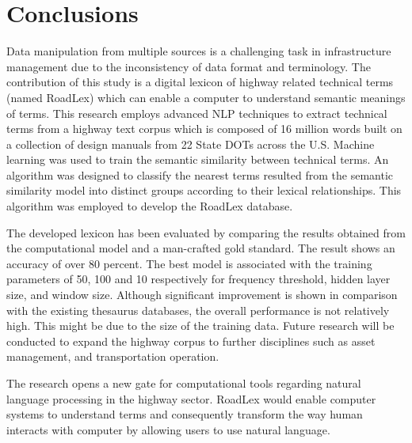 \documentclass[Journal, BackFigs, DoubleSpace]{ascelike}%
\begin{document}
\section{Conclusions} \label{sec:conclns3} 
Data manipulation from multiple sources is a challenging task in infrastructure management due to the inconsistency of data format and terminology. The contribution of this study is a digital lexicon of highway related technical terms (named RoadLex) which can enable a computer to understand semantic meanings of terms.  This research employs advanced NLP techniques to extract technical terms from a highway text corpus which is composed of 16 million words built on a collection of design manuals from 22 State DOTs across the U.S. Machine learning was used to train the semantic similarity between technical terms. An algorithm was designed to classify the nearest terms resulted from the semantic similarity model into distinct groups according to their lexical relationships. This algorithm was employed to develop the RoadLex database. 
\par
The developed lexicon has been evaluated by comparing the results obtained from the computational model and a man-crafted gold standard. The result shows an accuracy of over 80 percent.  The best model is associated with the training parameters of 50, 100 and 10 respectively for frequency threshold, hidden layer size, and window size. Although significant improvement is shown in comparison with the existing thesaurus databases, the overall performance is not relatively high. This might be due to the size of the training data. Future research will be conducted to expand the highway corpus to further disciplines such as asset management, and transportation operation. 
\par
The research opens a new gate for computational tools regarding natural language processing in the highway sector. RoadLex would enable computer systems to understand terms and consequently transform the way human interacts with computer by allowing users to use natural language. 


%
%
\end{document}
